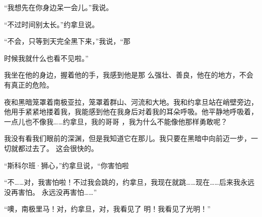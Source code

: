 \documentclass{article}
\begin{document}
“我想先在你身边呆一会儿。”我说。 


“不过时间别太长。”约拿旦说。 

“不会，只等到天完全黑下来，”我说，“那

\newpage
时候我就什么也看不见啦。” 

我坐在他的身边，握着他的手，我感到他是那
么强壮、善良，他在的地方，不会有真正的危险。 

夜和黑暗笼罩着南极亚拉，笼罩着群山、河流和大地。我和约拿旦站在峭壁旁边，他用手紧紧地搂着我，我能感到他在我身后对着我的耳朵呼吸。他平静地呼吸着，一点儿也不像我……约拿旦，我的哥哥
，我为什么不能像他那样勇敢呢？ 

我没有看我们眼前的深渊，但是我知道它在那儿。我只要在黑暗中向前迈一步，一切就都过去了。
这会很快的。 

“斯科尔班·狮心，”约拿旦说，“你害怕啦

“不……对，我害怕啦！不过我会跳的，约拿旦，我现在就跳……现在……后来我永远没再害怕。
永远没再害怕……” 

“噢，南极里马！对，约拿旦，对，我看见了
\newpage
明！我看见了光明！”
\end{document}
